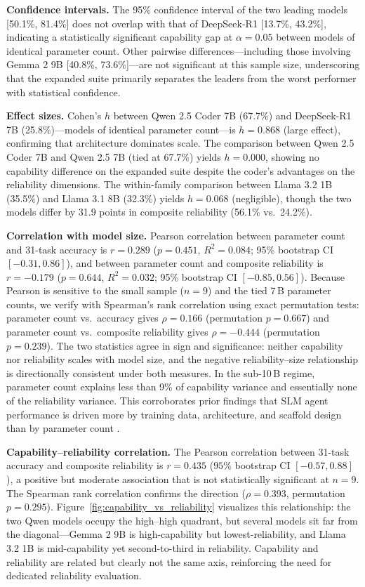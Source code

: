 \textbf{Confidence intervals.} The 95\% confidence interval of the two leading models [50.1\%, 81.4\%] does not overlap with that of DeepSeek-R1 [13.7\%, 43.2\%], indicating a statistically significant capability gap at $\alpha = 0.05$ between models of identical parameter count. Other pairwise differences---including those involving Gemma 2 9B [40.8\%, 73.6\%]---are not significant at this sample size, underscoring that the expanded suite primarily separates the leaders from the worst performer with statistical confidence.

\textbf{Effect sizes.} Cohen's $h$ between Qwen 2.5 Coder 7B (67.7\%) and DeepSeek-R1 7B (25.8\%)---models of identical parameter count---is $h = 0.868$ (large effect), confirming that architecture dominates scale. The comparison between Qwen 2.5 Coder 7B and Qwen 2.5 7B (tied at 67.7\%) yields $h = 0.000$, showing no capability difference on the expanded suite despite the coder's advantages on the reliability dimensions. The within-family comparison between Llama 3.2 1B (35.5\%) and Llama 3.1 8B (32.3\%) yields $h = 0.068$ (negligible), though the two models differ by 31.9 points in composite reliability (56.1\% vs.\ 24.2\%).

\textbf{Correlation with model size.} Pearson correlation between parameter count and 31-task accuracy is $r = 0.289$ ($p = 0.451$, $R^2 = 0.084$; 95\% bootstrap CI $[-0.31, 0.86]$), and between parameter count and composite reliability is $r = -0.179$ ($p = 0.644$, $R^2 = 0.032$; 95\% bootstrap CI $[-0.85, 0.56]$). Because Pearson is sensitive to the small sample ($n = 9$) and the tied 7\,B parameter counts, we verify with Spearman's rank correlation using exact permutation tests: parameter count vs.\ accuracy gives $\rho = 0.166$ (permutation $p = 0.667$) and parameter count vs.\ composite reliability gives $\rho = -0.444$ (permutation $p = 0.239$). The two statistics agree in sign and significance: neither capability nor reliability scales with model size, and the negative reliability--size relationship is directionally consistent under both measures. In the sub-10\,B regime, parameter count explains less than 9\% of capability variance and essentially none of the reliability variance. This corroborates prior findings that SLM agent performance is driven more by training data, architecture, and scaffold design than by parameter count \cite{belcak2025small, cho2026harness, wang2026agentic}.

\textbf{Capability--reliability correlation.} The Pearson correlation between 31-task accuracy and composite reliability is $r = 0.435$ ($95\%$ bootstrap CI $[-0.57, 0.88]$), a positive but moderate association that is not statistically significant at $n = 9$. The Spearman rank correlation confirms the direction ($\rho = 0.393$, permutation $p = 0.295$). Figure~\ref{fig:capability_vs_reliability} visualizes this relationship: the two Qwen models occupy the high--high quadrant, but several models sit far from the diagonal---Gemma 2 9B is high-capability but lowest-reliability, and Llama 3.2 1B is mid-capability yet second-to-third in reliability. Capability and reliability are related but clearly not the same axis, reinforcing the need for dedicated reliability evaluation.

